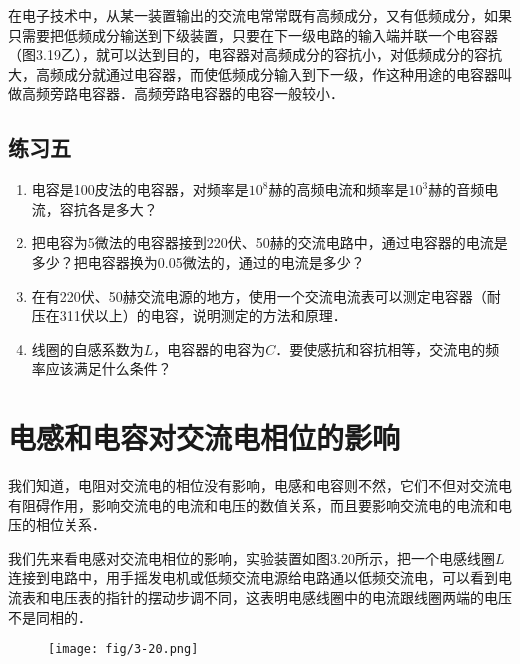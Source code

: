 在电子技术中，从某一装置输出的交流电常常既有高频成分，又有低频成分，如果只需要把低频成分输送到下级装置，只要在下一级电路的输入端并联一个电容器（图3.19乙），就可以达到目的，电容器对高频成分的容抗小，对低频成分的容抗大，高频成分就通过电容器，而使低频成分输入到下一级，作这种用途的电容器叫做高频旁路电容器．高频旁路电容器的电容一般较小．

\subsection*{练习五}
\begin{enumerate}
    \item 电容是100皮法的电容器，对频率是$10^8$赫的高频电流和频率是$10^3$赫的音频电流，容抗各是多大？
    \item 把电容为5微法的电容器接到220伏、50赫的交流电路中，通过电容器的电流是多少？把电容器换为0.05微法的，通过的电流是多少？
    \item 在有220伏、50赫交流电源的地方，使用一个交流电流表可以测定电容器（耐压在311伏以上）的电容，说明测定的方法和原理．
    \item 线圈的自感系数为$L$，电容器的电容为$C$．要使感抗和容抗相等，交流电的频率应该满足什么条件？
\end{enumerate}

\section{电感和电容对交流电相位的影响}
我们知道，电阻对交流电的相位没有影响，电感和电容则不然，它们不但对交流电有阻碍作用，影响交流电的电流和电压的数值关系，而且要影响交流电的电流和电压的相位关系．

我们先来看电感对交流电相位的影响，实验装置如图3.20所示，把一个电感线圈$L$连接到电路中，用手摇发电机或低频交流电源给电路通以低频交流电，可以看到电流表和电压表的指针的摆动步调不同，这表明电感线圈中的电流跟线圈两端的电压不是同相的．
\begin{figure}[htp]\centering
    \texttt{[image: fig/3-20.png]}
    \caption{}
    \end{figure}

